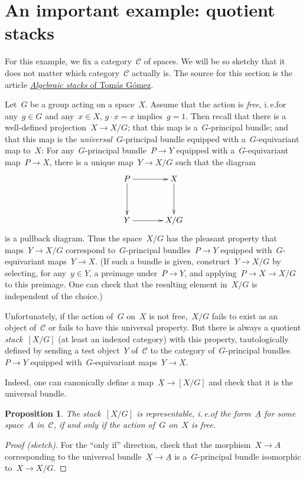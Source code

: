 \documentclass[a4paper,english,12pt]{scrartcl}
\theoremstyle{definition}
\theoremstyle{plain}
\newtheorem{prop}[defn]{Proposition}
\theoremstyle{remark}
\newcommand{\C}{\mathcal{C}}
\newcommand{\ul}[1]{\underline{#1}}
\begin{document}
\section{An important example: quotient stacks}

For this example, we fix a category~$\C$ of spaces. We will be so sketchy that
it does not matter which category~$\C$ actually is. The source for this section
is the article \href{http://arxiv.org/abs/math/9911199}{\emph{Algebraic stacks}
of Tomás Gómez}.

Let~$G$ be a group acting on a space~$X$. Assume that the action is
\emph{free}, i.\,e.\@ for any~$g \in G$ and any~$x \in X$, $g \cdot x = x$
implies~$g = 1$. Then recall that there is a well-defined projection~$X \to
X/G$; that this map is a~$G$-principal bundle; and that this map is the
\emph{universal}~$G$-principal bundle equipped with a~$G$-equivariant map
to~$X$: For any~$G$-principal bundle~$P \to Y$ equipped with a~$G$-equivariant
map~$P \to X$, there is a unique map~$Y \to X/G$ such that the diagram
\[ \xymatrixcolsep{3pc}\xymatrixrowsep{3pc}\xymatrix{
  P \ar[r] \ar[d] & X \ar[d] \\
  Y \ar[r] & X/G
} \]
is a pullback diagram. Thus the space~$X/G$ has the pleasant property that
maps~$Y \to X/G$ correspond to~$G$-principal bundles~$P \to Y$ equipped
with~$G$-equivariant maps~$Y \to X$. (If such a bundle is given, construct~$Y
\to X/G$ by selecting, for any~$y \in Y$, a preimage under~$P \to Y$, and
applying~$P \to X \to X/G$ to this preimage. One can check that the resulting
element in~$X/G$ is independent of the choice.)

Unfortunately, if the action of~$G$ on~$X$ is not free,~$X/G$ fails to exist as
an object of~$\C$ or fails to have this universal property. But there is always
a quotient \emph{stack}~$[X/G]$ (at least an indexed category) with this
property, tautologically defined by sending a test object~$Y$ of~$\C$ to the
category of~$G$-principal bundles~$P \to Y$ equipped with~$G$-equivariant
maps~$Y \to X$.

Indeed, one can canonically define a map~$\ul{X} \to [X/G]$ and check that
it is the universal bundle.

\begin{prop}The stack~$[X/G]$ is representable, i.\,e.\@ of the form~$\ul{A}$
for some space~$A$ in~$\C$, if and only if the action of~$G$ on~$X$ is
free.\end{prop}
\begin{proof}[Proof (sketch)]
For the ``only if'' direction, check that the morphism~$X \to A$ corresponding
to the universal bundle~$\ul{X} \to \ul{A}$ is a~$G$-principal bundle
isomorphic to~$X \to X/G$.
\end{proof}
\end{document}
